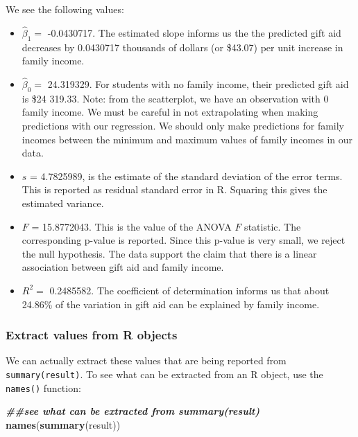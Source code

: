 \documentclass[
]{book}
\newenvironment{Shaded}{\begin{snugshade}}{\end{snugshade}}
\newcommand{\DocumentationTok}[1]{\textcolor[rgb]{0.56,0.35,0.01}{\textbf{\textit{#1}}}}
\newcommand{\FunctionTok}[1]{\textcolor[rgb]{0.13,0.29,0.53}{\textbf{#1}}}
\newcommand{\NormalTok}[1]{#1}
\providecommand{\tightlist}{%
  \setlength{\itemsep}{0pt}\setlength{\parskip}{0pt}}
\begin{document}
We see the following values:

\begin{itemize}
\tightlist
\item
  \(\hat{\beta}_1 =\) -0.0430717. The estimated slope informs us the the predicted gift aid decreases by 0.0430717 thousands of dollars (or \$43.07) per unit increase in family income.
\item
  \(\hat{\beta}_0 =\) 24.319329. For students with no family income, their predicted gift aid is \$24 319.33. Note: from the scatterplot, we have an observation with 0 family income. We must be careful in not extrapolating when making predictions with our regression. We should only make predictions for family incomes between the minimum and maximum values of family incomes in our data.
\item
  \(s\) = 4.7825989, is the estimate of the standard deviation of the error terms. This is reported as residual standard error in R. Squaring this gives the estimated variance.
\item
  \(F\) = 15.8772043. This is the value of the ANOVA \(F\) statistic. The corresponding p-value is reported. Since this p-value is very small, we reject the null hypothesis. The data support the claim that there is a linear association between gift aid and family income.
\item
  \(R^2 =\) 0.2485582. The coefficient of determination informs us that about 24.86\% of the variation in gift aid can be explained by family income.
\end{itemize}

\hypertarget{extract-values-from-r-objects}{%
\subsubsection*{Extract values from R objects}\label{extract-values-from-r-objects}}

We can actually extract these values that are being reported from \texttt{summary(result)}. To see what can be extracted from an R object, use the \texttt{names()} function:

\begin{Shaded}
\begin{Highlighting}[]
\DocumentationTok{\#\#see what can be extracted from summary(result)}
\FunctionTok{names}\NormalTok{(}\FunctionTok{summary}\NormalTok{(result))}
\end{Highlighting}
\end{Shaded}
\end{document}
